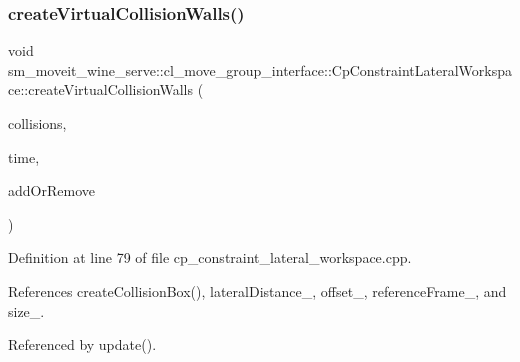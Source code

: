 \subsubsection{\texorpdfstring{create\+Virtual\+Collision\+Walls()}{createVirtualCollisionWalls()}}
{\footnotesize\ttfamily void sm\+\_\+moveit\+\_\+wine\+\_\+serve\+::cl\+\_\+move\+\_\+group\+\_\+interface\+::\+Cp\+Constraint\+Lateral\+Workspace\+::create\+Virtual\+Collision\+Walls (\begin{DoxyParamCaption}\item[{std\+::vector$<$ moveit\+\_\+msgs\+::\+Collision\+Object $>$ \&}]{collisions,  }\item[{const ros\+::\+Time \&}]{time,  }\item[{int}]{add\+Or\+Remove }\end{DoxyParamCaption})}



Definition at line 79 of file cp\+\_\+constraint\+\_\+lateral\+\_\+workspace.\+cpp.



References create\+Collision\+Box(), lateral\+Distance\+\_\+, offset\+\_\+, reference\+Frame\+\_\+, and size\+\_\+.



Referenced by update().


